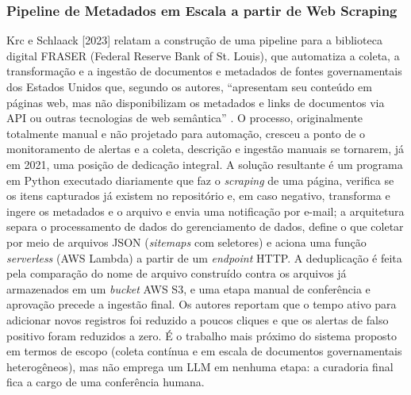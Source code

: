 \documentclass[12pt]{article}
\begin{document}
  \subsubsection{Pipeline de Metadados em Escala a partir de Web Scraping}
  Krc e Schlaack [2023] relatam a construção de uma pipeline para a biblioteca digital FRASER (Federal Reserve Bank of St. Louis), que automatiza a coleta, a transformação e a ingestão de documentos e metadados de fontes governamentais dos Estados Unidos que, segundo os autores, ``apresentam seu conteúdo em páginas web, mas não disponibilizam os metadados e links de documentos via API ou outras tecnologias de web semântica'' \cite{b3}. O processo, originalmente totalmente manual e não projetado para automação, cresceu a ponto de o monitoramento de alertas e a coleta, descrição e ingestão manuais se tornarem, já em 2021, uma posição de dedicação integral. A solução resultante é um programa em Python executado diariamente que faz o \emph{scraping} de uma página, verifica se os itens capturados já existem no repositório e, em caso negativo, transforma e ingere os metadados e o arquivo e envia uma notificação por e-mail; a arquitetura separa o processamento de dados do gerenciamento de dados, define o que coletar por meio de arquivos JSON (\emph{sitemaps} com seletores) e aciona uma função \emph{serverless} (AWS Lambda) a partir de um \emph{endpoint} HTTP. A deduplicação é feita pela comparação do nome de arquivo construído contra os arquivos já armazenados em um \emph{bucket} AWS S3, e uma etapa manual de conferência e aprovação precede a ingestão final. Os autores reportam que o tempo ativo para adicionar novos registros foi reduzido a poucos cliques e que os alertas de falso positivo foram reduzidos a zero. É o trabalho mais próximo do sistema proposto em termos de escopo (coleta contínua e em escala de documentos governamentais heterogêneos), mas não emprega um LLM em nenhuma etapa: a curadoria final fica a cargo de uma conferência humana.
\end{document}
